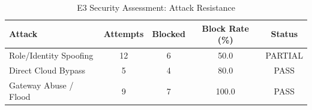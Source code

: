 \begin{table}[ht]
\centering
\caption{E3 Security Assessment: Attack Resistance}
\begin{tabular}{lcccc}
\toprule
\textbf{Attack} & \textbf{Attempts} & \textbf{Blocked} & \textbf{Block Rate (\%)} & \textbf{Status} \\
\midrule
Role/Identity Spoofing & 12 & 6 & 50.0 & PARTIAL \\
Direct Cloud Bypass & 5 & 4 & 80.0 & PASS \\
Gateway Abuse / Flood & 9 & 7 & 100.0 & PASS \\
\bottomrule
\end{tabular}
\label{tab:e3-security}
\end{table}
